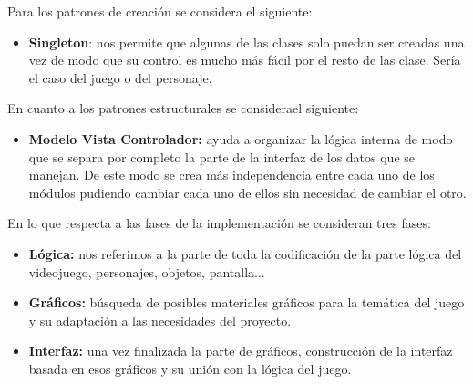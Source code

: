 \documentclass[palatino]{apuntes}
\begin{document}
Para los patrones de creación se considera el siguiente:
\begin{itemize}
	\item \textbf{Singleton}: nos permite que algunas de las clases solo puedan ser creadas una vez de modo que su control es mucho más fácil por el resto de las clase. Sería el caso del juego o del personaje.
\end{itemize}

En cuanto a los patrones estructurales se considerael siguiente:
\begin{itemize}
	\item \textbf{Modelo Vista Controlador:} ayuda a organizar la lógica interna de modo que se separa por completo la parte de la interfaz de los datos que se manejan. De este modo se crea más independencia entre cada uno de los módulos pudiendo cambiar cada uno de ellos sin necesidad de cambiar el otro.
\end{itemize}

En lo que respecta a las fases de la implementación se consideran tres fases:

\begin{itemize}
	\item \textbf{Lógica:} nos referimos a la parte de toda la codificación de la parte lógica del videojuego, personajes, objetos, pantalla...
	\item \textbf{Gráficos:} búsqueda de posibles materiales gráficos para la temática del juego y su adaptación a las necesidades del proyecto.
	\item \textbf{Interfaz:} una vez finalizada la parte de gráficos, construcción de la interfaz basada en esos gráficos y su unión con la lógica del juego.
\end{itemize}
\end{document}
